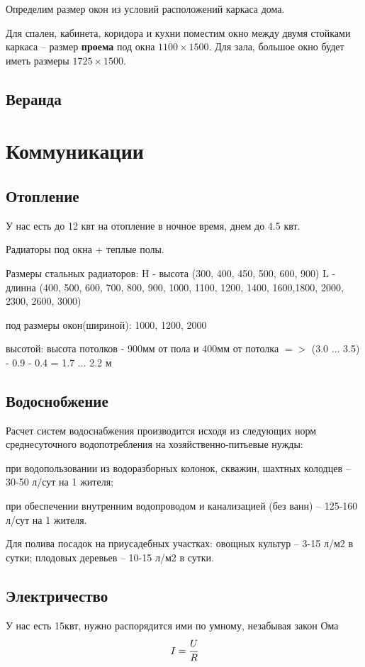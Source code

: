\documentclass[10pt, twocolumn]{report}
\newenvironment{itemize*}%
{\begin{itemize}%
	\setlength{\itemsep}{1pt}%
	\setlength{\parskip}{1pt}}%
{\end{itemize}}
\begin{document}
Определим размер окон из условий расположений каркаса дома.

Для спален, кабинета, коридора и кухни поместим окно между двумя стойками каркаса -- размер \textbf{проема} под окна $1100 \times 1500$. Для зала, большое окно будет иметь размеры $1725 \times 1500$. 

\chapter{Веранда}

\part{Коммуникации}

\chapter{Отопление}
У нас есть до 12 квт на отопление в ночное время, днем до 4.5 квт.

Радиаторы под окна + теплые полы.

Размеры стальных радиаторов:
H - высота (300, 400, 450, 500, 600, 900)
L - длинна (400, 500, 600, 700, 800, 900, 1000, 1100, 1200, 1400, 1600,1800, 2000, 2300, 2600, 3000)

под размеры окон(шириной): 1000, 1200, 2000

высотой: высота потолков - 900мм от пола и 400мм от потолка $=>$ (3.0 ... 3.5) - 0.9 - 0.4 = 1.7 ... 2.2 м

\chapter{Водоснобжение}
Расчет систем водоснабжения производится исходя из следующих норм среднесуточного водопотребления на хозяйственно-питьевые нужды:

\begin{itemize*}
	\item при водопользовании из водоразборных колонок, скважин, шахтных колодцев -- 30-50 л/сут на 1 жителя;
	\item при обеспечении внутренним водопроводом и канализацией (без ванн) -- 125-160 л/сут на 1 жителя.
	\item Для полива посадок на приусадебных участках: овощных культур -- 3-15 л/м2 в сутки; плодовых деревьев -- 10-15 л/м2 в сутки.
\end{itemize*}


\chapter{Электричество}
У нас есть 15квт, нужно распорядится ими по умному, незабывая закон Ома $$ I = \cfrac{U}{R} $$
\end{document}

